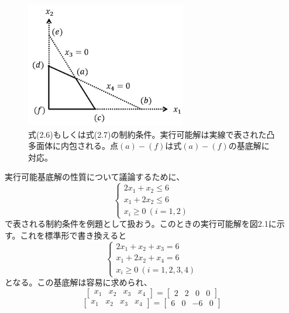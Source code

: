\documentclass[dvipdfmx, 9pt, a4paper]{jsarticle}
\numberwithin{equation}{section}
\begin{document}
\begin{figure}[b]
\begin{center}
\includegraphics[width=7cm]{fig1.png}
\caption{式(2.6)もしくは式(2.7)の制約条件。実行可能解は実線で表された凸多面体に内包される。点$(a)-(f)$は式$(a)-(f)$の基底解に対応。}
\end{center}
\end{figure}
実行可能基底解の性質について議論するために、
\begin{equation}
\left\{
\begin{array}{l}
2x_1+x_2 \leq 6 \\
x_1 + 2x_2 \leq 6 \\
x_i \geq 0~(i=1,2)
\end{array}
\right.
\end{equation}
で表される制約条件を例題として扱おう。このときの実行可能解を図2.1に示す。これを標準形で書き換えると
\begin{equation}
\left\{
\begin{array}{l}
2x_1+x_2+x_3=6 \\
x_1+2x_2+x_4=6 \\
x_i \geq 0~(i=1,2,3,4)
\end{array}
\right.
\end{equation}
となる。この基底解は容易に求められ、
\begin{equation}
\begin{bmatrix}
x_1 & x_2 & x_3 & x_4
\end{bmatrix}=
\begin{bmatrix}
2 & 2 & 0 & 0
\end{bmatrix} \tag{a}
\end{equation}
\begin{equation}
\begin{bmatrix}
x_1 & x_2 & x_3 & x_4
\end{bmatrix}=
\begin{bmatrix}
6 & 0 & -6 & 0
\end{bmatrix} \tag{b}
\end{equation}
\end{document}
